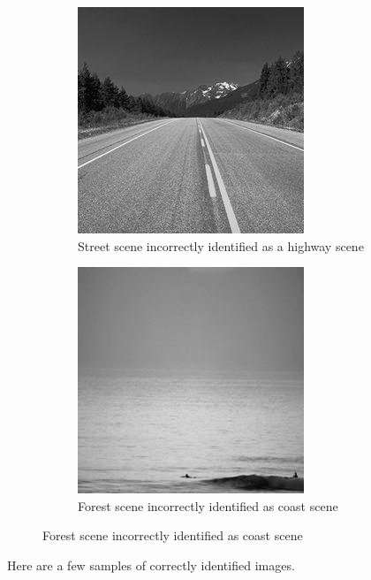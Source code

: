\begin{homeworkProblem}
\begin{figure}[H]
\begin{subfigure}{0.5\textwidth}
    \end{subfigure}%
    \begin{subfigure}{0.5\textwidth}
      \centering
      \caption{Street scene incorrectly identified as a highway scene}
      \includegraphics[width=.5\linewidth]{./images/incept/highway_street_1.jpg}
    \end{subfigure}
    \begin{subfigure}{0.5\textwidth}
      \centering
      \caption{Forest scene incorrectly identified as coast scene}
      \includegraphics[width=.5\linewidth]{./images/incept/coast_forest_1.jpg}
    \end{subfigure}%
  \end{figure}

  \pagebreak
  Here are a few samples of correctly identified images.


\end{homeworkProblem}

